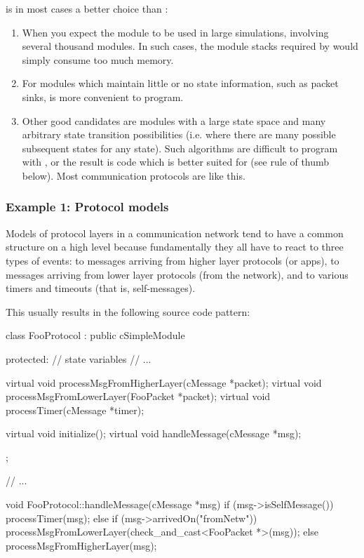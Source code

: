  is in most cases a better choice than :

\begin{enumerate}
  \item{When you expect the module to be used in large simulations,
      involving several thousand modules. In such cases, the module stacks
      required by  would simply consume too much memory.}
  \item{For modules which maintain little or no state information,
      such as packet sinks,  is more convenient to program.}
  \item{Other good candidates are modules with a large state space and
      many arbitrary state transition possibilities (i.e. where there
      are many possible subsequent states for any state). Such algorithms
      are difficult to program with , or the result is code
      which is better suited for  (see rule of thumb
      below). Most communication protocols are like this.}
\end{enumerate}


\subsubsection{Example 1: Protocol models}

Models of protocol layers in a communication network tend to have
a common structure on a high level because fundamentally they all have to react
to three types of events: to messages arriving from higher layer protocols
(or apps), to messages arriving from lower layer protocols (from the network),
and to various timers and timeouts (that is, self-messages).

This usually results in the following source code pattern:

\begin{cpp}
class FooProtocol : public cSimpleModule
{
  protected:
    // state variables
    // ...

    virtual void processMsgFromHigherLayer(cMessage *packet);
    virtual void processMsgFromLowerLayer(FooPacket *packet);
    virtual void processTimer(cMessage *timer);

    virtual void initialize();
    virtual void handleMessage(cMessage *msg);
};

// ...

void FooProtocol::handleMessage(cMessage *msg)
{
    if (msg->isSelfMessage())
        processTimer(msg);
    else if (msg->arrivedOn("fromNetw"))
        processMsgFromLowerLayer(check_and_cast<FooPacket *>(msg));
    else
        processMsgFromHigherLayer(msg);
}
\end{cpp}

